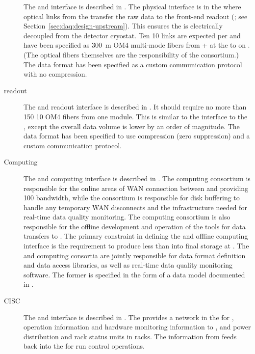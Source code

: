 \begin{description}
\item[ ] The  and   interface is described in
. The physical interface is in the  where optical links from the  transfer
the raw  data to the  front-end readout (; see
Section~\ref{sec:daq:design-upstream}). This ensures the  is electrically decoupled from the detector
cryostat. Ten \SI{10}{\Gbps} links are expected per  and have
been specified as \SI{300}{\meter} OM4 multi-mode fibers from + at the  to
 on . (The optical fibers themselves are
the responsibility of the  consortium.) The data format has been specified
as a custom communication protocol with no
compression.

\item[ readout] The  and  readout interface is described in
. It should
require no more than 150  \SI{10}{\Gbps} OM4 fibers from one  module. 
This
is similar to the interface to the  , except the overall
data volume is lower by an order of magnitude. The data format has been specified to use
compression (zero suppression) and a custom communication protocol.

\item[Computing] The  and computing interface is described in .
 The computing consortium
 is responsible for the online areas of WAN connection between  and
\fnal providing \SI{100}{\Gbps} bandwidth, while the  consortium is responsible for disk buffering
to handle any temporary WAN disconnects and the infrastructure needed
for real-time data quality monitoring.  The computing consortium 
is also
responsible for the offline development and operation of the tools for data
transfers to \fnal. The primary
constraint in defining the  and offline computing interface is the
requirement to produce less than \offsitepbpy 
into final storage at
\fnal. The  and
computing consortia are jointly responsible for data
format definition and data access libraries, as well as real-time data
quality monitoring software. The former is specified in the form of a 
data model documented in .

\item[CISC] The  and  interface is described in
. The  provides a network in the  for ,  operation information and hardware
monitoring information to , and power distribution and
rack status units in  racks. The information from 
feeds back into the  for run control operations.


\end{description}
